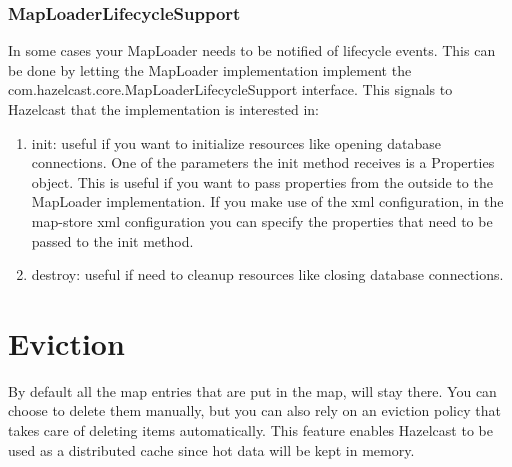 \subsubsection*{MapLoaderLifecycleSupport}
In some cases your MapLoader needs to be notified of lifecycle events. This can be done by letting the MapLoader implementation implement the com.hazelcast.core.MapLoaderLifecycleSupport interface. This signals to Hazelcast that the implementation is interested in:
\begin{enumerate}
\item init: useful if you want to initialize resources like opening database connections. One of the parameters the init method receives is a Properties object. This is useful if you want to pass properties from the outside to the MapLoader implementation. If you make use of the xml configuration, in the map-store xml configuration you can specify the properties that need to be passed to the init method.
\item destroy: useful if need to cleanup resources like closing database connections.
\end{enumerate}

\section{Eviction}
By default all the map entries that are put in the map, will stay there. You can choose to delete them manually, but you can also rely on an eviction policy that takes care of deleting items automatically. This feature enables Hazelcast to be used as a distributed cache since hot data will be kept in memory. 

